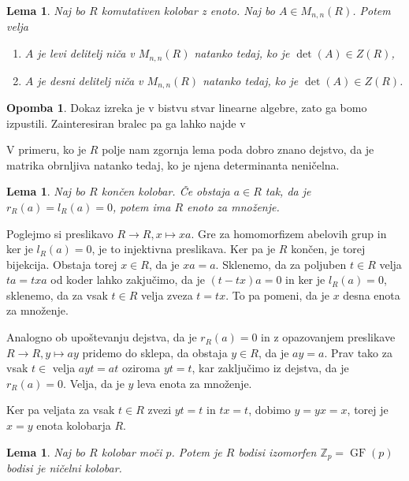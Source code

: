 \documentclass[a4paper, 12pt]{amsart}
\theoremstyle{definition} %
\newtheorem{opomba}[definicija]{Opomba}
\theoremstyle{plain} %
\newtheorem{lema}[definicija]{Lema}
\newcommand{\Z}{\mathbb Z}
\DeclareMathOperator{\GF}{GF}
\DeclareMathOperator{\deter}{det}
\begin{document}
\begin{lema}
\label{enostranskiDelitelji0Matricni}
Naj bo $R$ komutativen kolobar z enoto. Naj bo $A\in M_{n,n}(R)$. Potem velja
\begin{enumerate}
\item $A$ je levi delitelj niča v $M_{n,n}(R)$ natanko tedaj, ko je $\deter(A)\in Z(R)$,
\item $A$ je desni delitelj niča v $M_{n,n}(R)$ natanko tedaj, ko je $\deter(A)\in Z(R)$.
\end{enumerate}
\end{lema}

\begin{opomba}
Dokaz izreka je v bistvu stvar linearne algebre, zato ga bomo izpustili. Zainteresiran bralec pa ga lahko najde v \cite[Theorem 9.1]{Brown}
\end{opomba}

V primeru, ko je $R$ polje nam zgornja lema poda dobro znano dejstvo, da je matrika obrnljiva natanko tedaj, ko je njena determinanta neničelna.


\begin{lema}
\label{enota}
Naj bo $R$ končen kolobar. Če obstaja $a\in R$ tak, da je $r_R(a) = l_R(a) = 0$, potem ima $R$ enoto za množenje.
\end{lema}

\proof
Poglejmo si preslikavo $R \rightarrow R, x\mapsto xa$. Gre za homomorfizem abelovih grup in ker je $l_R(a) = 0$, je to injektivna preslikava. Ker pa je $R$ končen, je torej bijekcija. Obstaja torej $x \in R$, da je $xa = a$. Sklenemo, da za poljuben $t\in R$ velja $ta = txa$ od koder lahko zakjučimo, da je $(t-tx)a = 0$ in ker je $l_R(a) = 0$, sklenemo, da  za vsak $t\in R$ velja zveza $t = tx$. To pa pomeni, da je $x$ desna enota za množenje.

Analogno ob upoštevanju dejstva, da je $r_R(a) = 0$ in z opazovanjem preslikave $R\rightarrow R, y \mapsto ay$ pridemo do sklepa, da obstaja $y \in R$, da je $ay=a$. Prav tako za vsak $t\in $ velja $ayt = at$ oziroma $yt=t$, kar zaključimo iz dejstva, da je $r_R(a) =0$. Velja, da je $y$ leva enota za množenje.

Ker pa veljata za vsak $t\in R$ zvezi $yt=t$ in $tx=t$, dobimo $y=yx=x$, torej je $x=y$ enota kolobarja $R$.
\endproof

\begin{lema}
\label{pkolobar}
Naj bo $R$ kolobar moči $p$. Potem je $R$ bodisi izomorfen $\Z_p = \GF(p)$ bodisi je ničelni kolobar.
\end{lema} 
\end{document}
